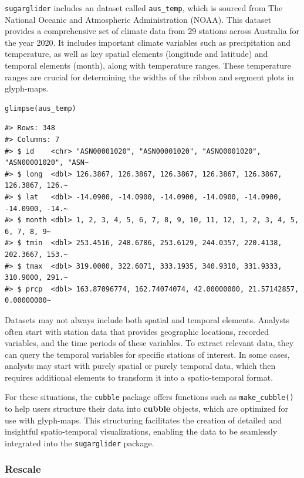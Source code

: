 \texttt{sugarglider} includes an dataset called \texttt{aus\_temp}, which is sourced from The National Oceanic and Atmospheric Administration (NOAA). This dataset provides a comprehensive set of climate data from 29 stations across Australia for the year 2020. It includes important climate variables such as precipitation and temperature, as well as key spatial elements (longitude and latitude) and temporal elements (month), along with temperature ranges. These temperature ranges are crucial for determining the widths of the ribbon and segment plots in glyph-maps.

\begin{verbatim}
glimpse(aus_temp)
\end{verbatim}

\begin{verbatim}
#> Rows: 348
#> Columns: 7
#> $ id    <chr> "ASN00001020", "ASN00001020", "ASN00001020", "ASN00001020", "ASN~
#> $ long  <dbl> 126.3867, 126.3867, 126.3867, 126.3867, 126.3867, 126.3867, 126.~
#> $ lat   <dbl> -14.0900, -14.0900, -14.0900, -14.0900, -14.0900, -14.0900, -14.~
#> $ month <dbl> 1, 2, 3, 4, 5, 6, 7, 8, 9, 10, 11, 12, 1, 2, 3, 4, 5, 6, 7, 8, 9~
#> $ tmin  <dbl> 253.4516, 248.6786, 253.6129, 244.0357, 220.4138, 202.3667, 153.~
#> $ tmax  <dbl> 319.0000, 322.6071, 333.1935, 340.9310, 331.9333, 310.9000, 291.~
#> $ prcp  <dbl> 163.87096774, 162.74074074, 42.00000000, 21.57142857, 0.00000000~
\end{verbatim}

Datasets may not always include both spatial and temporal elements. Analysts often start with station data that provides geographic locations, recorded variables, and the time periods of these variables. To extract relevant data, they can query the temporal variables for specific stations of interest. In some cases, analysts may start with purely spatial or purely temporal data, which then requires additional elements to transform it into a spatio-temporal format.

For these situations, the \texttt{cubble} package offers functions such as \texttt{make\_cubble()} to help users structure their data into \textbf{cubble} objects, which are optimized for use with glyph-maps. This structuring facilitates the creation of detailed and insightful spatio-temporal visualizations, enabling the data to be seamlessly integrated into the \texttt{sugarglider} package.

\subsubsection{Rescale}\label{rescale}


